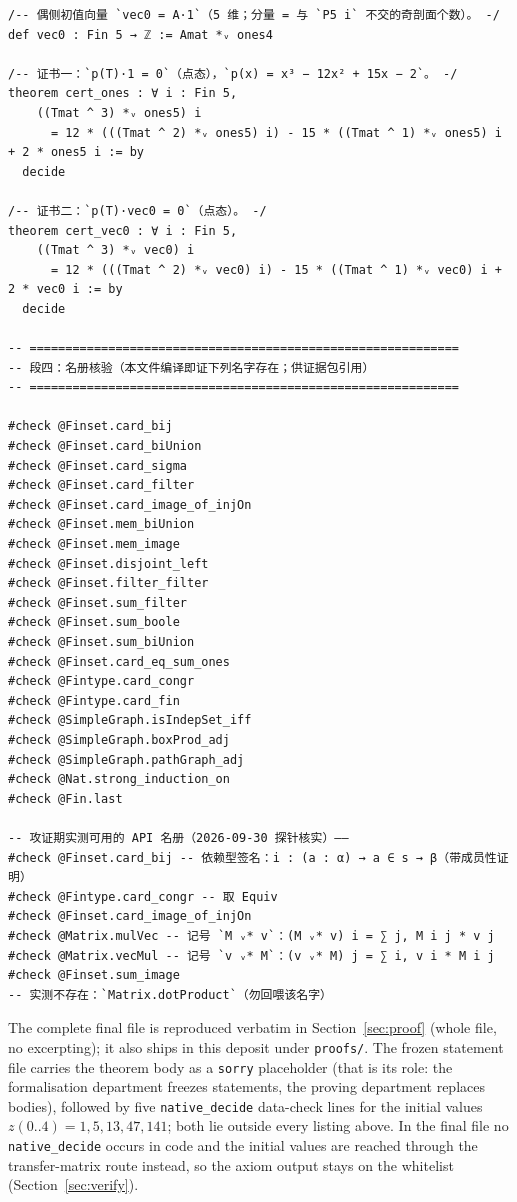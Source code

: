 \documentclass[11pt]{article}
\begin{document}
\begin{lstlisting}
/-- 偶侧初值向量 `vec0 = A·1`（5 维；分量 = 与 `P5 i` 不交的奇剖面个数）。 -/
def vec0 : Fin 5 → ℤ := Amat *ᵥ ones4

/-- 证书一：`p(T)·1 = 0`（点态），`p(x) = x³ − 12x² + 15x − 2`。 -/
theorem cert_ones : ∀ i : Fin 5,
    ((Tmat ^ 3) *ᵥ ones5) i
      = 12 * (((Tmat ^ 2) *ᵥ ones5) i) - 15 * ((Tmat ^ 1) *ᵥ ones5) i + 2 * ones5 i := by
  decide

/-- 证书二：`p(T)·vec0 = 0`（点态）。 -/
theorem cert_vec0 : ∀ i : Fin 5,
    ((Tmat ^ 3) *ᵥ vec0) i
      = 12 * (((Tmat ^ 2) *ᵥ vec0) i) - 15 * ((Tmat ^ 1) *ᵥ vec0) i + 2 * vec0 i := by
  decide

-- ============================================================
-- 段四：名册核验（本文件编译即证下列名字存在；供证据包引用）
-- ============================================================

#check @Finset.card_bij
#check @Finset.card_biUnion
#check @Finset.card_sigma
#check @Finset.card_filter
#check @Finset.card_image_of_injOn
#check @Finset.mem_biUnion
#check @Finset.mem_image
#check @Finset.disjoint_left
#check @Finset.filter_filter
#check @Finset.sum_filter
#check @Finset.sum_boole
#check @Finset.sum_biUnion
#check @Finset.card_eq_sum_ones
#check @Fintype.card_congr
#check @Fintype.card_fin
#check @SimpleGraph.isIndepSet_iff
#check @SimpleGraph.boxProd_adj
#check @SimpleGraph.pathGraph_adj
#check @Nat.strong_induction_on
#check @Fin.last

-- 攻证期实测可用的 API 名册（2026-09-30 探针核实）——
#check @Finset.card_bij -- 依赖型签名：i : (a : α) → a ∈ s → β（带成员性证明）
#check @Fintype.card_congr -- 取 Equiv
#check @Finset.card_image_of_injOn
#check @Matrix.mulVec -- 记号 `M ᵥ* v`：(M ᵥ* v) i = ∑ j, M i j * v j
#check @Matrix.vecMul -- 记号 `v ᵥ* M`：(v ᵥ* M) j = ∑ i, v i * M i j
#check @Finset.sum_image
-- 实测不存在：`Matrix.dotProduct`（勿回喂该名字）

\end{lstlisting}

The complete final file is reproduced verbatim in Section~\ref{sec:proof}
(whole file, no excerpting); it also ships in this deposit under
\texttt{proofs/}. The frozen statement file carries the theorem body as a
\texttt{sorry} placeholder (that is its role: the formalisation department
freezes statements, the proving department replaces bodies), followed by
five \texttt{native\_decide} data-check lines for the initial values
$z(0..4) = 1, 5, 13, 47, 141$; both lie outside every listing above. In the
final file no \texttt{native\_decide} occurs in code and the initial values
are reached through the transfer-matrix route instead, so the axiom output
stays on the whitelist (Section~\ref{sec:verify}).
\end{document}

